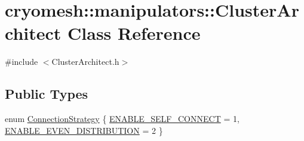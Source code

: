 \hypertarget{classcryomesh_1_1manipulators_1_1ClusterArchitect}{\section{cryomesh\-:\-:manipulators\-:\-:\-Cluster\-Architect \-Class \-Reference}
\label{classcryomesh_1_1manipulators_1_1ClusterArchitect}
}


{\ttfamily \#include $<$\-Cluster\-Architect.\-h$>$}

\subsection*{\-Public \-Types}
\begin{DoxyCompactItemize}
\item 
enum \hyperlink{classcryomesh_1_1manipulators_1_1ClusterArchitect_a0188a785aaeb3c5f2cbbbe62259fa01b}{\-Connection\-Strategy} \{ \hyperlink{classcryomesh_1_1manipulators_1_1ClusterArchitect_a0188a785aaeb3c5f2cbbbe62259fa01ba94bf69771f5d79e3a1b0b942869de362}{\-E\-N\-A\-B\-L\-E\-\_\-\-S\-E\-L\-F\-\_\-\-C\-O\-N\-N\-E\-C\-T} = 1, 
\hyperlink{classcryomesh_1_1manipulators_1_1ClusterArchitect_a0188a785aaeb3c5f2cbbbe62259fa01ba851f2313adc7277f4d051dd7f50ec39f}{\-E\-N\-A\-B\-L\-E\-\_\-\-E\-V\-E\-N\-\_\-\-D\-I\-S\-T\-R\-I\-B\-U\-T\-I\-O\-N} = 2
 \}
\end{DoxyCompactItemize}
